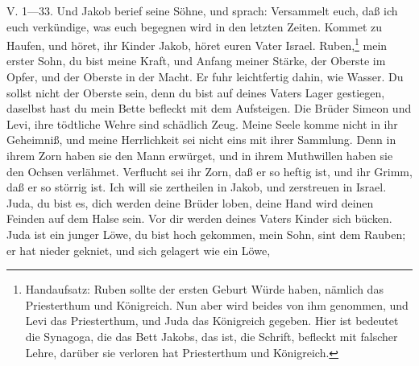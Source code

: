 V. 1—33. Und Jakob berief seine Söhne, und sprach: Versammelt euch, daß ich euch verkündige, was euch begegnen wird in den letzten Zeiten. Kommet zu Haufen, und höret, ihr Kinder Jakob, höret euren Vater Israel. Ruben,\footnote{Handaufsatz: Ruben sollte der ersten Geburt Würde haben, nämlich das Priesterthum und Königreich. Nun aber wird beides von ihm genommen, und Levi das Priesterthum, und Juda das Königreich gegeben. Hier ist bedeutet die Synagoga, die das Bett Jakobs, das ist, die Schrift, befleckt mit falscher Lehre, darüber sie verloren hat Priesterthum und Königreich.} mein erster Sohn, du bist meine Kraft, und Anfang meiner Stärke, der Oberste im Opfer, und der Oberste in der Macht. Er fuhr leichtfertig dahin, wie Wasser. Du sollst nicht der Oberste sein, denn du bist auf deines Vaters Lager gestiegen, daselbst hast du mein Bette befleckt mit dem Aufsteigen. Die Brüder Simeon und Levi, ihre tödtliche Wehre sind schädlich Zeug. Meine Seele komme nicht in ihr Geheimniß, und meine Herrlichkeit sei nicht eins mit ihrer Sammlung. Denn in ihrem Zorn haben sie den Mann erwürget, und in ihrem Muthwillen haben sie den Ochsen verlähmet. Verflucht sei ihr Zorn, daß er so heftig ist, und ihr Grimm, daß er so störrig ist. Ich will sie zertheilen in Jakob, und zerstreuen in Israel. Juda, du bist es, dich werden deine Brüder loben, deine Hand wird deinen Feinden auf dem Halse sein. Vor dir werden deines Vaters Kinder sich bücken. Juda ist ein junger Löwe, du bist hoch gekommen, mein Sohn, sint dem Rauben; er hat nieder gekniet, und sich gelagert wie ein Löwe,
